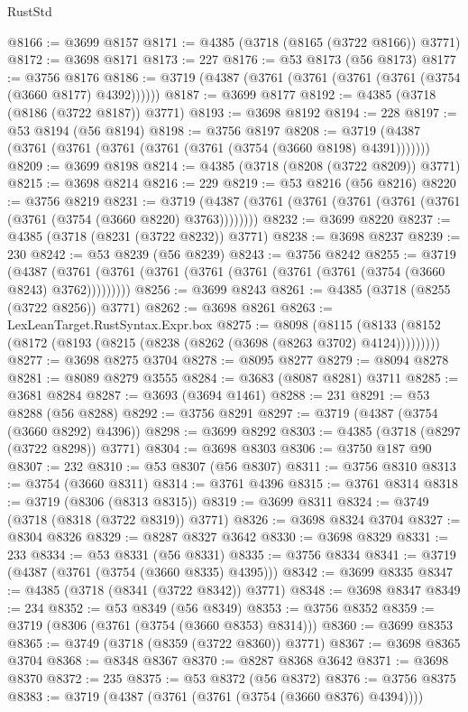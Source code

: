 \begin{lexlean}{RustStd}
\begin{coremodule}
@8166 := @3699 @8157
@8171 := @4385 (@3718 (@8165 (@3722 @8166)) @3771)
@8172 := @3698 @8171
@8173 := 227
@8176 := @53 @8173 (@56 @8173)
@8177 := @3756 @8176
@8186 := @3719 (@4387 (@3761 (@3761 (@3761 (@3761 (@3754 (@3660 @8177) @4392))))))
@8187 := @3699 @8177
@8192 := @4385 (@3718 (@8186 (@3722 @8187)) @3771)
@8193 := @3698 @8192
@8194 := 228
@8197 := @53 @8194 (@56 @8194)
@8198 := @3756 @8197
@8208 := @3719 (@4387 (@3761 (@3761 (@3761 (@3761 (@3761 (@3754 (@3660 @8198) @4391)))))))
@8209 := @3699 @8198
@8214 := @4385 (@3718 (@8208 (@3722 @8209)) @3771)
@8215 := @3698 @8214
@8216 := 229
@8219 := @53 @8216 (@56 @8216)
@8220 := @3756 @8219
@8231 := @3719 (@4387 (@3761 (@3761 (@3761 (@3761 (@3761 (@3761 (@3754 (@3660 @8220) @3763))))))))
@8232 := @3699 @8220
@8237 := @4385 (@3718 (@8231 (@3722 @8232)) @3771)
@8238 := @3698 @8237
@8239 := 230
@8242 := @53 @8239 (@56 @8239)
@8243 := @3756 @8242
@8255 := @3719
    (@4387 (@3761 (@3761 (@3761 (@3761 (@3761 (@3761 (@3761 (@3754 (@3660 @8243) @3762)))))))))
@8256 := @3699 @8243
@8261 := @4385 (@3718 (@8255 (@3722 @8256)) @3771)
@8262 := @3698 @8261
@8263 := LexLeanTarget.RustSyntax.Expr.box
@8275 := @8098
    (@8115 (@8133 (@8152 (@8172 (@8193 (@8215 (@8238 (@8262 (@3698 (@8263 @3702) @4124)))))))))
@8277 := @3698 @8275 @3704
@8278 := @8095 @8277
@8279 := @8094 @8278
@8281 := @8089 @8279 @3555
@8284 := @3683 (@8087 @8281) @3711
@8285 := @3681 @8284
@8287 := @3693 (@3694 @1461)
@8288 := 231
@8291 := @53 @8288 (@56 @8288)
@8292 := @3756 @8291
@8297 := @3719 (@4387 (@3754 (@3660 @8292) @4396))
@8298 := @3699 @8292
@8303 := @4385 (@3718 (@8297 (@3722 @8298)) @3771)
@8304 := @3698 @8303
@8306 := @3750 @187 @90
@8307 := 232
@8310 := @53 @8307 (@56 @8307)
@8311 := @3756 @8310
@8313 := @3754 (@3660 @8311)
@8314 := @3761 @4396
@8315 := @3761 @8314
@8318 := @3719 (@8306 (@8313 @8315))
@8319 := @3699 @8311
@8324 := @3749 (@3718 (@8318 (@3722 @8319)) @3771)
@8326 := @3698 @8324 @3704
@8327 := @8304 @8326
@8329 := @8287 @8327 @3642
@8330 := @3698 @8329
@8331 := 233
@8334 := @53 @8331 (@56 @8331)
@8335 := @3756 @8334
@8341 := @3719 (@4387 (@3761 (@3754 (@3660 @8335) @4395)))
@8342 := @3699 @8335
@8347 := @4385 (@3718 (@8341 (@3722 @8342)) @3771)
@8348 := @3698 @8347
@8349 := 234
@8352 := @53 @8349 (@56 @8349)
@8353 := @3756 @8352
@8359 := @3719 (@8306 (@3761 (@3754 (@3660 @8353) @8314)))
@8360 := @3699 @8353
@8365 := @3749 (@3718 (@8359 (@3722 @8360)) @3771)
@8367 := @3698 @8365 @3704
@8368 := @8348 @8367
@8370 := @8287 @8368 @3642
@8371 := @3698 @8370
@8372 := 235
@8375 := @53 @8372 (@56 @8372)
@8376 := @3756 @8375
@8383 := @3719 (@4387 (@3761 (@3761 (@3754 (@3660 @8376) @4394))))

\end{coremodule}
\end{lexlean}
